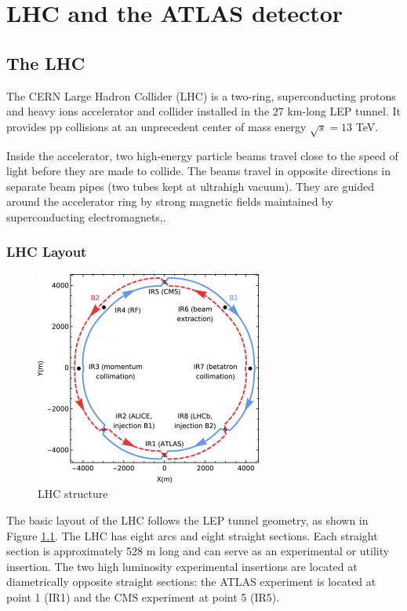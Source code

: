 \documentclass[a4paper, oneside]{book}
\begin{document}
\tableofcontents

	\chapter{LHC and the ATLAS detector}
		\section{The LHC}
			The CERN Large Hadron Collider (LHC) \cite{LHC design} is a two-ring, superconducting protons and heavy ions accelerator and collider installed in the 27 km-long LEP tunnel. It provides pp collisions at an unprecedent center of mass energy $\sqrt{s} = 13$ TeV.
			
			Inside the accelerator, two high-energy particle beams travel close to the speed of light before they are made to collide. The beams travel in opposite directions in separate beam pipes (two tubes kept at ultrahigh vacuum). They are guided around the accelerator ring by strong magnetic fields maintained by superconducting electromagnets\cite{LHC introduction},\cite{LHC site}.
				\subsection{LHC Layout}
					\begin{figure}[H]
						\centering
						\includegraphics[width=0.3\textheight]{tesi_images/LHC_structure.jpg}
						\caption{LHC structure}
						\label{fig:LHC structure}
					\end{figure}
					The basic layout of the LHC follows the LEP tunnel geometry, as shown in Figure \ref{fig:LHC structure}. The LHC has eight arcs and eight straight sections. Each straight section is approximately 528 m long and can serve as an experimental or utility insertion. The two high luminosity experimental insertions are located at diametrically opposite straight sections: the ATLAS experiment is located at point 1 (IR1) and the CMS experiment at point 5 (IR5).
					
\end{document}
